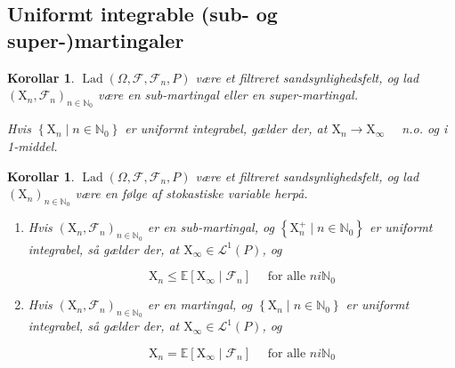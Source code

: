\documentclass{article}
\newcommand{\1}{\mathbbm{1}}
\theoremstyle{boxed}
\newtheorem{corollary}[theorem]{Korollar}
\begin{document}
\subsection{Uniformt integrable (sub- og super-)martingaler}
\begin{theorem-box}
    \begin{corollary}
        $\operatorname{Lad}\left(\Omega, \mathcal{F}, \mathcal{F}_n, P\right)$ være et filtreret sandsynlighedsfelt, og lad $\left(\mathrm{X}_n, \mathcal{F}_n\right)_{n \in \mathbb{N}_0}$ være en sub-martingal eller en super-martingal.

Hvis $\left\{\mathrm{X}_n \mid n \in \mathbb{N}_0\right\}$ er uniformt integrabel, gælder der, at $\mathrm{X}_n \rightarrow \mathrm{X}_{\infty} \quad$ n.o. og i 1-middel.
    \end{corollary}
\end{theorem-box}
\begin{theorem-box}
    \begin{corollary}
        $\operatorname{Lad}\left(\Omega, \mathcal{F}, \mathcal{F}_n, P\right)$ være et filtreret sandsynlighedsfelt, og lad $\left(\mathrm{X}_n\right)_{n \in \mathbb{N}_0}$ være en følge af stokastiske variable herpå.
\begin{enumerate}
    \item[\textnormal{(i)}] Hvis $\left(\mathrm{X}_n, \mathcal{F}_n\right)_{n \in \mathbb{N}_0}$ er en sub-martingal, og $\left\{\mathrm{X}_n^{+} \mid n \in \mathbb{N}_0\right\}$ er uniformt integrabel, så gælder der, at $\mathrm{X}_{\infty} \in \mathcal{L}^1(P)$, og

    $$
    \mathrm{X}_n \leq \mathbb{E}\left[\mathrm{X}_{\infty} \mid \mathcal{F}_n\right] \quad \text { for alle } n i \mathbb{N}_0
    $$
    \item[\textnormal{(ii)}] Hvis $\left(\mathrm{X}_n, \mathcal{F}_n\right)_{n \in \mathbb{N}_0}$ er en martingal, og $\left\{\mathrm{X}_n \mid n \in \mathbb{N}_0\right\}$ er uniformt integrabel, så gælder der, at $\mathrm{X}_{\infty} \in \mathcal{L}^1(P)$, og

    $$
    \mathrm{X}_n=\mathbb{E}\left[\mathrm{X}_{\infty} \mid \mathcal{F}_n\right] \quad \text { for alle } n i \mathbb{N}_0
    $$
\end{enumerate}
    \end{corollary}
\end{theorem-box}
\end{document}
